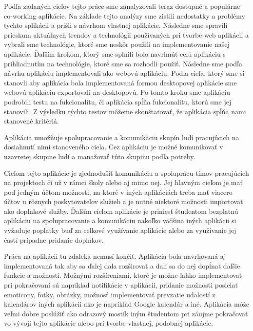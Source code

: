 \indent Podľa zadaných cieľov tejto práce sme zanalyzovali teraz dostupné a populárne co-working aplikácie. Na základe tejto analýzy sme zistili nedostatky a problémy tychto splikácii a prišli s návrhom vlastnej aplikácie. Následne sme spravili prieskum aktuálnych trendov a technológii používaných pri tvorbe web aplikácii a vybrali sme technológie, ktoré sme neskôr použili na implementovanie našej aplikácie. Ďaľším krokom, ktorý sme splnili bolo navrhnúť celú aplikáciu s prihliadnutím na technológie, ktoré sme sa rozhodli použiť. Následne sme podľa návrhu aplikáciu implementovali ako webovú aplikáciu. Podľa cieľa, ktorý sme si stanovli aby aplikácia bola implementovaná formou desktopovej aplikácie sme webovú aplikáciu exportovali na desktopovú. Po tomto kroku sme aplikáciu podrobili testu na fukcionalitu, či aplikácia spĺňa fukcionalitu, ktorú sme jej stanovili. Z výsledku týchto testov môžeme skonštatovať, že aplikácia spĺňa nami stanovené kritériá.

\indent Aplikácia umožňuje spolupracovanie a komunikáciu skupín ludí pracujúcich na dosiahnutí nimi stanoveného ciela. Cez aplikáciu je možné komunikovať v uzavretej skupine ludí a manažovať túto skupinu podľa potreby.

\indent Cieľom tejto aplikácie je zjednodušiť komunikáciu a spoluprácu tímov pracujúcich na projektoch či už v rámci školy alebo aj mimo nej. Jej hlavným cieľom je mať pod jedným účtom možnosti, na ktoré v iných aplikáciách treba mať viacero účtov u rôznych poskytovateľov služieb a je nutné niektoré možnosti importovať ako doplnkové služby. Ďaľším cielom aplikácie je priniesť študentom bezplatnú aplikáciu na spolupracovanie a komunikáciu nakoľko väčšina iných aplikácii si vyžaduje poplatky buď za celkové využívanie aplikácie alebo za využívanie jej častí prípadne pridanie doplnkov. 

\indent Práca na aplikácii tu zdaleka nemusí končiť. Aplikácia bola navrhovaná aj implementovaná tak aby sa ďalej dala rozširovať a dali sa do nej dopĺnať ďaľšie funkcie a možnosti. Možnými rozšíreniami, ktoré je možne ľahko implementovať pri pokračovaní sú napríklad notifikácie v aplikácii, pridanie možnosti posielať emoticony, fotky, obrázky, možnosť implementovať prevzatie udalostí z kalendárov iných aplikácii ako je napríklad Google kalendár a iné. Aplikácia môže veľmi dobre poslúžiť ako odrazový mostík iným študentom pri záujme pokračovať vo vývoji tejto aplikácie alebo pri tvorbe vlastnej, podobnej aplikácie. 